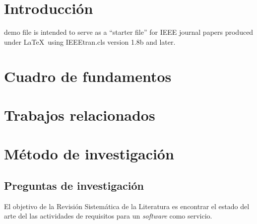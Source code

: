 \documentclass[conference,onecolumn,10pt]{IEEEtran}
\begin{document}
\section{Introducción}
% 
% 
% 
% 
 demo file is intended to serve as a ``starter file''
for IEEE journal papers produced under \LaTeX\ using
IEEEtran.cls version 1.8b and later.
\section{Cuadro de fundamentos}
\newpage

\section{Trabajos relacionados}
\newpage

\section{Método de investigación}


\subsection{Preguntas de investigación}
El objetivo de la Revisión Sistemática de la Literatura es encontrar el estado del arte del las actividades de requisitos para un \emph{software} como servicio. 
\end{document}
